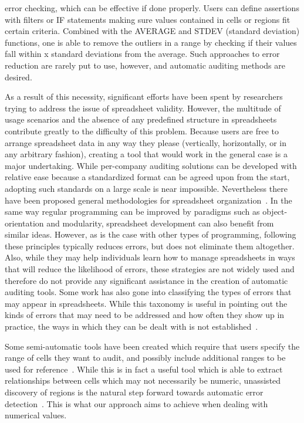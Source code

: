 
error checking, which can be effective if done properly. Users can
define assertions with filters or IF statements making sure values
contained in cells or regions fit certain criteria. Combined with the
AVERAGE and STDEV (standard deviation) functions, one is able to
remove the outliers in a range by checking if their values fall within
x standard deviations from the average. Such approaches to error
reduction are rarely put to use, however, and automatic auditing
methods are desired.

As a result of this necessity, significant efforts have been spent by
researchers trying to address the issue of spreadsheet
validity. However, the multitude of usage scenarios and the absence of
any predefined structure in spreadsheets contribute greatly to the
difficulty of this problem. Because users are free to arrange
spreadsheet data in any way they please (vertically, horizontally, or
in any arbitrary fashion), creating a tool that would work in the
general case is a major undertaking. While per-company auditing
solutions can be developed with relative ease because a standardized
format can be agreed upon from the start, adopting such standards on a
large scale is near impossible. Nevertheless there have been proposed
general methodologies for spreadsheet organization~\cite{panko1998we}. %
 In the same
way regular programming can be improved by paradigms such as
object-orientation and modularity, spreadsheet development can also
benefit from similar ideas. However, as is the case with other types
of programming, following these principles typically reduces errors,
but does not eliminate them altogether. Also, while they may help
individuals learn how to manage spreadsheets in ways that will reduce
the likelihood of errors, these strategies are not widely used and
therefore do not provide any significant assistance in the creation of
automatic auditing tools.  Some work has also gone into classifying
the types of errors that may appear in spreadsheets. While this
taxonomy is useful in pointing out the kinds of errors that may need
to be addressed and how often they show up in practice, the ways in
which they can be dealt with is not established~\cite{rajalingham2005revised}. %

Some semi-automatic tools have been created which require that users
specify the range of cells they want to audit, and possibly include
additional ranges to be used for reference~\cite{FIXME}. %
 While this is in fact
a useful tool which is able to extract relationships between cells
which may not necessarily be numeric, unassisted discovery of regions
is the natural step forward towards automatic error detection~\cite{fisher2006scaling}. %
This is what our approach aims to achieve when dealing with
numerical values.

